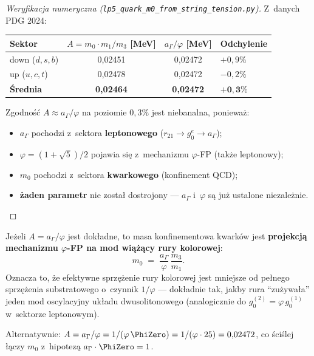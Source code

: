\begin{proof}[Weryfikacja numeryczna (\texttt{lp5\_quark\_m0\_from\_string\_tension.py})]
Z~danych PDG 2024:
\begin{center}\footnotesize
\begin{tabular}{@{}lccl@{}}
\toprule
  Sektor & $A = m_0 \cdot m_1/m_3$ [MeV] & $a_\Gamma/\varphi$ [MeV]
    & Odchylenie \\
\midrule
  down ($d, s, b$) & 0{,}02451 & 0{,}02472 & $+0{,}9\%$ \\
  up ($u, c, t$)   & 0{,}02478 & 0{,}02472 & $-0{,}2\%$ \\
\midrule
  \textbf{\'Srednia} & \textbf{0{,}02464} & \textbf{0{,}02472}
    & $\mathbf{+0{,}3\%}$ \\
\bottomrule
\end{tabular}
\end{center}
Zgodność $A \approx a_\Gamma/\varphi$ na poziomie $0{,}3\%$
jest niebanalna, poniewa\.z:
\begin{itemize}[nosep]
  \item $a_\Gamma$ pochodzi z~sektora \textbf{leptonowego}
    ($r_{21} \to g_0^e \to a_\Gamma$);
  \item $\varphi = (1+\sqrt{5})/2$ pojawia się z~mechanizmu
    $\varphi$-FP (tak\.ze leptonowy);
  \item $m_0$ pochodzi z~sektora \textbf{kwarkowego}
    (konfinement QCD);
  \item \textbf{\.zaden parametr} nie zosta\l{} dostrojony
    --- $a_\Gamma$ i~$\varphi$ s\k{a} ju\.z ustalone
    niezale\.znie.
\end{itemize}
\end{proof}

\begin{remark}\label{rem:X-A-interpretation}
Je\.zeli $A = a_\Gamma/\varphi$ jest dok\l{}adne, to masa
konfinementowa kwark\'ow jest \textbf{projekcj\k{a}
mechanizmu $\varphi$-FP na mod wi\k{a}\.z\k{a}cy rury kolorowej}:
\begin{equation}
  m_0 \;=\; \frac{a_\Gamma}{\varphi}\,\frac{m_3}{m_1}.
\end{equation}
Oznacza to, \.ze efektywne sprzężenie rury kolorowej jest
mniejsze od pe\l{}nego sprzężenia substratowego o~czynnik
$1/\varphi$ --- dok\l{}adnie tak, jakby rura ``zu\.zywa\l{}a''
jeden mod oscylacyjny uk\l{}adu dwusolitonowego
(analogicznie do $g_0^{(2)} = \varphi\,g_0^{(1)}$ w~sektorze
leptonowym).

Alternatywnie: $A = a_\Gamma/\varphi = 1/(\varphi\,\PhiZero)
= 1/(\varphi \cdot 25) = 0{,}02472$, co \'sci\'slej
\l{}\k{a}czy $m_0$ z~hipotez\k{a}
$a_\Gamma \cdot \PhiZero = 1$.
\end{remark}

